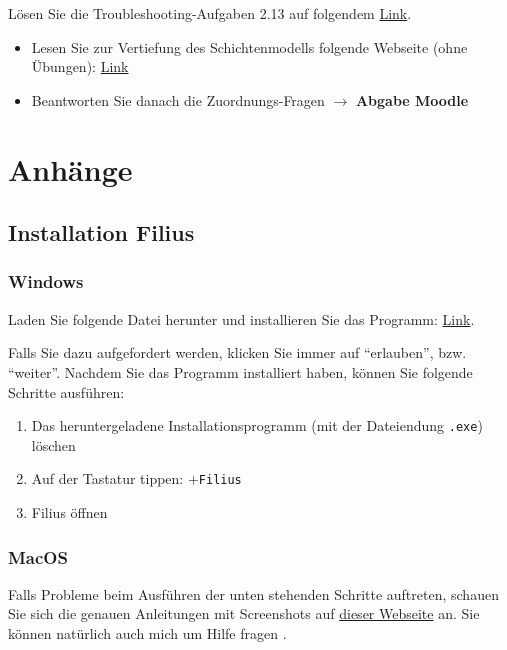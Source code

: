 \begin{myexercise}
	Lösen Sie die Troubleshooting-Aufgaben 2.13 auf folgendem \href{https://informatik.mygymer.ch/base/?book=network}{Link}.
\end{myexercise}

\begin{mychallenge}
	\begin{itemize}
		\item Lesen Sie zur Vertiefung des Schichtenmodells folgende Webseite (ohne Übungen): \href{https://oinf.ch/kurs/vernetzung-und-systeme/kommunikation-in-netzwerken/}{Link}
		\item Beantworten Sie danach die Zuordnungs-Fragen $\rightarrow$ \textbf{Abgabe Moodle}
	\end{itemize}
\end{mychallenge}

\newpage
\appendix
\section*{Anhänge}
\renewcommand{\thesubsection}{\Alph{subsection}}
\subsection{Installation Filius}
\label{subsec:filius-installation}
\subsubsection{Windows}
Laden Sie folgende Datei herunter und installieren Sie das Programm:  \href{https://informatik.mygymer.ch/base/?page=network/2-filius/windows/}{Link}.

Falls Sie dazu aufgefordert werden, klicken Sie immer auf ``erlauben'', bzw. ``weiter''. Nachdem Sie das Programm installiert haben, können Sie folgende Schritte ausführen:
\begin{enumerate}
	\item Das heruntergeladene Installationsprogramm (mit der Dateiendung \texttt{.exe}) löschen
	\item Auf der Tastatur tippen: \faWindows+\texttt{Filius}
	\item Filius öffnen
\end{enumerate}
\subsubsection{MacOS}
\begin{mycaution}
	Falls Probleme beim Ausführen der unten stehenden Schritte auftreten, schauen Sie sich die genauen Anleitungen mit Screenshots auf \href{https://oinf.ch/wp-content/uploads/Anleitung_Filius_Mac-OS.pdf}{dieser Webseite} an. Sie können natürlich auch mich um Hilfe fragen .
\end{mycaution}
